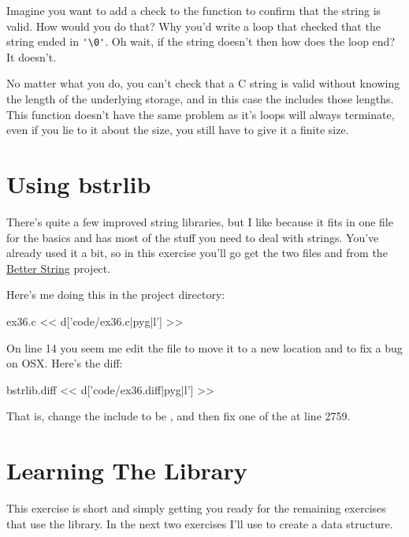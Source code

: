 Imagine you want to add a check to the  function to confirm
that the  string is valid.  How would you do that?  Why
you'd write a loop that checked that the string ended in \verb|'\0'|.
Oh wait, if the string doesn't then how does the loop end?  It doesn't.

No matter what you do, you can't check that a C string is valid without
knowing the length of the underlying storage, and in this case the 
 includes those lengths.  This function doesn't have
the same problem as it's loops will always terminate, even if you lie
to it about the size, you still have to give it a finite size.

\section{Using bstrlib}

There's quite a few improved string libraries, but I like 
because it fits in one file for the basics and has most of the stuff you need
to deal with strings.  You've already used it a bit, so in this exercise you'll
go get the two files  and  from the
\href{http://bstring.sourceforge.net/}{Better String} project.

Here's me doing this in the  project directory:

\begin{code}{ex36.c}
<< d['code/ex36.c|pyg|l'] >>
\end{code}

On line 14 you seem me edit the  file to move it
to a new location and to fix a bug on OSX.  Here's the diff:

\begin{code}{bstrlib.diff}
<< d['code/ex36.diff|pyg|l'] >>
\end{code}

That is, change the include to be , and then
fix one of the  at line 2759.

\section{Learning The Library}

This exercise is short and simply getting you ready for the remaining 
exercises that use the library.  In the next two exercises I'll use
 to create a  data structure.

